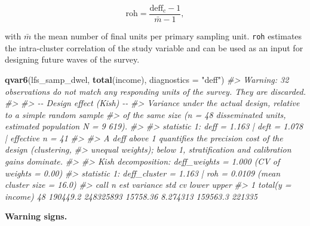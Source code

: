 \documentclass[
]{article}
\newenvironment{Shaded}{\begin{snugshade}}{\end{snugshade}}
\newcommand{\AttributeTok}[1]{\textcolor[rgb]{0.13,0.29,0.53}{#1}}
\newcommand{\CommentTok}[1]{\textcolor[rgb]{0.56,0.35,0.01}{\textit{#1}}}
\newcommand{\FunctionTok}[1]{\textcolor[rgb]{0.13,0.29,0.53}{\textbf{#1}}}
\newcommand{\NormalTok}[1]{#1}
\newcommand{\StringTok}[1]{\textcolor[rgb]{0.31,0.60,0.02}{#1}}
\begin{document}
\[\mathrm{roh} = \frac{\mathrm{deff}_c - 1}{\bar m - 1},\]

with \(\bar m\) the mean number of final units per primary sampling
unit. \texttt{roh} estimates the intra-cluster correlation of the study
variable and can be used as an input for designing future waves of the
survey.

\begin{Shaded}
\begin{Highlighting}[]
\FunctionTok{qvar6}\NormalTok{(lfs\_samp\_dwel, }\FunctionTok{total}\NormalTok{(income), }\AttributeTok{diagnostics =} \StringTok{"deff"}\NormalTok{)}
\CommentTok{\#\textgreater{} Warning: 32 observations do not match any responding units of the survey. They are discarded.}
\CommentTok{\#\textgreater{} }
\CommentTok{\#\textgreater{} {-}{-} Design effect (Kish) {-}{-}}
\CommentTok{\#\textgreater{} Variance under the actual design, relative to a simple random sample}
\CommentTok{\#\textgreater{} of the same size (n = 48 disseminated units, estimated population N = 9 619).}
\CommentTok{\#\textgreater{} }
\CommentTok{\#\textgreater{}   statistic 1:  deff = 1.163  |  deft = 1.078  |  effective n = 41}
\CommentTok{\#\textgreater{} }
\CommentTok{\#\textgreater{} A deff above 1 quantifies the precision cost of the design (clustering,}
\CommentTok{\#\textgreater{} unequal weights); below 1, stratification and calibration gains dominate.}
\CommentTok{\#\textgreater{} }
\CommentTok{\#\textgreater{}   Kish decomposition:  deff\_weights = 1.000 (CV of weights = 0.00)}
\CommentTok{\#\textgreater{}   statistic 1:  deff\_cluster = 1.163  |  roh = 0.0109  (mean cluster size = 16.0)}
\CommentTok{\#\textgreater{}                call  n      est  variance      std       cv    lower  upper}
\CommentTok{\#\textgreater{} 1 total(y = income) 48 190449.2 248325893 15758.36 8.274313 159563.3 221335}
\end{Highlighting}
\end{Shaded}

\textbf{Warning signs.}
\end{document}
